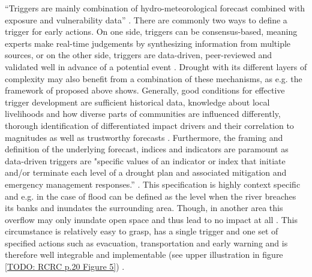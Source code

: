 {%
“Triggers are mainly combination of hydro-meteorological forecast combined with exposure and vulnerability data” \autocite[19]{rcrcFORECASTBASEDFINANCINGEARLY2020}. There are commonly two ways to define a trigger for early actions. On one side, triggers can be consensus-based, meaning experts make real-time judgements by synthesizing information from multiple sources, or on the other side, triggers are data-driven, peer-reviewed and validated well in advance of a potential event \autocite{rcrcFORECASTBASEDFINANCINGEARLY2020}. Drought with its different layers of complexity may also benefit from a combination of these mechanisms, as e.g. the framework of \autocite{boultDroughtImpactbasedForecasting2022} proposed above shows. Generally, good conditions for effective trigger development are sufficient historical data, knowledge about local livelihoods and how diverse parts of communities are influenced differently, thorough identification of differentiated impact drivers and their correlation to magnitudes as well as trustworthy forecasts \autocite{coughlandeperezForecastbasedFinancingApproach2015,coughlandeperezActionbasedFloodForecasting2016,elisabethstephensFORECASTBASEDACTION2015,harrowsmithFutureForecastImpact2020,rcrcFORECASTBASEDFINANCINGEARLY2020}. 
Furthermore, the framing and definition of the underlying forecast, indices and indicators are paramount as data-driven triggers are "specific values of an indicator or index that initiate and/or terminate each level of a drought plan and associated mitigation and emergency management responses.” \autocites{rcrcFORECASTBASEDFINANCINGEARLY2020}[13]{svobodaHandbookDroughtIndicators2016}. This specification is highly context specific and e.g. in the case of flood can be defined as the level when the river breaches its banks and inundates the surrounding area. Though, in another area this overflow may only inundate open space and thus lead to no impact at all \autocite{elisabethstephensFORECASTBASEDACTION2015}. This circumstance is relatively easy to grasp, has a single trigger and one set of specified actions such as evacuation, transportation and early warning and is therefore well integrable and implementable (see upper illustration in figure \ref*{TODO: RCRC p.20 Figure 5}) \autocite{siahaanForecastbasedActionDREF2018}. 


}
